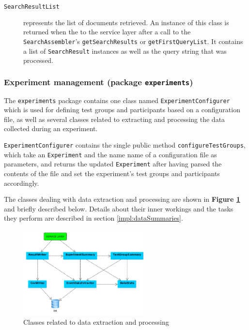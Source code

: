 \documentclass[a4paper]{usiinfbachelorproject}
\begin{document}
\begin{description}
    \item[\texttt{SearchResultList}] represents the list of documents retrieved. An instance of this
            class is returned when the to the service layer after a call to the \texttt{SearchAssembler}'s
            \texttt{getSearchResults} or \texttt{getFirstQueryList}. It contains a list of 
            \texttt{SearchResult} instances as well as  the query string that was processed.

\end{description}


\subsubsection{\textbf{Experiment management (package \texttt{experiments})}} \label{sec:archDataLayerExperiments}

The \texttt{experiments} package contains one class named \texttt{ExperimentConfigurer} which is used for defining
test groups and participants based on a configuration file, as well as several classes related to extracting and processing
the data collected during an experiment.

\texttt{ExperimentConfigurer} contains the single public method \texttt{configureTestGroups}, which take an 
\texttt{Experiment} and the name name of a configuration file as parameters, and returns the updated \texttt{Experiment}
after having parsed the contents of the file and set the experiment's test groups and participants accordingly.

The classes dealing with data extraction and processing are shown in \textbf{Figure \ref{fig:dataExtractionClasses}} and briefly described below.
Details about their inner workings and the tasks they perform are described in section \ref{impl:dataSummaries}.    

\begin{figure}[h!]
\centering
\includegraphics[width=0.6\textwidth]{figures/dataExtractionClasses}
\caption{Classes related to data extraction and processing}
\label{fig:dataExtractionClasses}
\end{figure}
\end{document}
